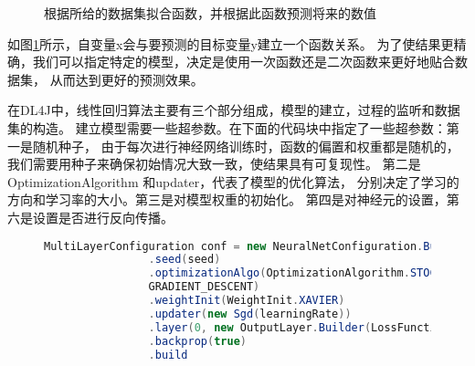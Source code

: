 \begin{figure}[!hb]
\begin{center}
    \caption{根据所给的数据集拟合函数，并根据此函数预测将来的数值}
    \label{Linear_picture}
\end{center}
\end{figure}


如图\ref{Linear_picture}所示，自变量x会与要预测的目标变量y建立一个函数关系。
为了使结果更精确，我们可以指定特定的模型，决定是使用一次函数还是二次函数来更好地贴合数据集，
从而达到更好的预测效果。

在DL4J中，线性回归算法主要有三个部分组成，模型的建立，过程的监听和数据集的构造。
建立模型需要一些超参数。在下面的代码块中指定了一些超参数：第一是随机种子，
由于每次进行神经网络训练时，函数的偏置和权重都是随机的，
我们需要用种子来确保初始情况大致一致，使结果具有可复现性。
第二是OptimizationAlgorithm 和updater，代表了模型的优化算法，
分别决定了学习的方向和学习率的大小。第三是对模型权重的初始化。
第四是对神经元的设置，第六是设置是否进行反向传播。

\begin{figure}[!ht]
\begin{lstlisting}[language=Java]
 MultiLayerConfiguration conf = new NeuralNetConfiguration.Builder()
                .seed(seed)
                .optimizationAlgo(OptimizationAlgorithm.STOCHASTIC_
                GRADIENT_DESCENT)
                .weightInit(WeightInit.XAVIER)
                .updater(new Sgd(learningRate))
                .layer(0, new OutputLayer.Builder(LossFunctions.LossFunction.MSE)
                .backprop(true)
                .build
\end{lstlisting}
\end{figure}

